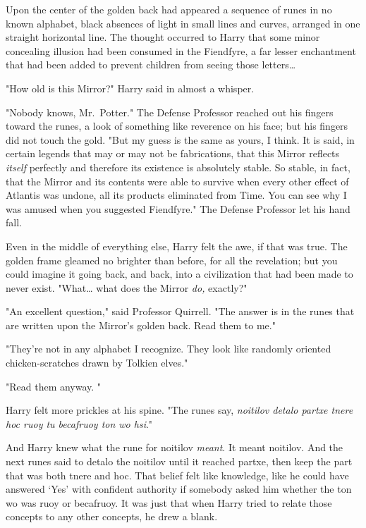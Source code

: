 Upon the center of the golden back had appeared a sequence of runes in no known 
alphabet, black absences of light in small lines and curves, arranged in one 
straight horizontal line. The thought occurred to Harry that some minor 
concealing illusion had been consumed in the Fiendfyre, a far lesser 
enchantment that had been added to prevent children from seeing those 
letters{\ldots}

"How old is this Mirror?" Harry said in almost a whisper.

"Nobody knows, Mr.~Potter." The Defense Professor reached out his fingers 
toward the runes, a look of something like reverence on his face; but his 
fingers did not touch the gold. "But my guess is the same as yours, I think. It 
is said, in certain legends that may or may not be fabrications, that this 
Mirror reflects \emph{itself} perfectly and therefore its existence is 
absolutely stable. So stable, in fact, that the Mirror and its contents were 
able to survive when every other effect of Atlantis was undone, all its 
products eliminated from Time. You can see why I was amused when you suggested 
Fiendfyre." The Defense Professor let his hand fall.

Even in the middle of everything else, Harry felt the awe, if that was true. 
The golden frame gleamed no brighter than before, for all the revelation; but 
you could imagine it going back, and back, into a civilization that had been 
made to never exist. "What{\ldots} what does the Mirror \emph{do,} exactly?"

"An excellent question," said Professor Quirrell. "The answer is in the runes 
that are written upon the Mirror's golden back. Read them to me."

"They're not in any alphabet I recognize. They look like randomly oriented 
chicken-scratches drawn by Tolkien elves."

"Read them anyway. "

Harry felt more prickles at his spine. "The runes say, \emph{noitilov detalo 
partxe tnere hoc ruoy tu becafruoy ton wo hsi}."

And Harry knew what the rune for noitilov \emph{meant}. It meant noitilov. And 
the next runes said to detalo the noitilov until it reached partxe, then keep 
the part that was both tnere and hoc. That belief felt like knowledge, like he 
could have answered `Yes' with confident authority if somebody asked him 
whether the ton wo was ruoy or becafruoy. It was just that when Harry tried to 
relate those concepts to any other concepts, he drew a blank.

